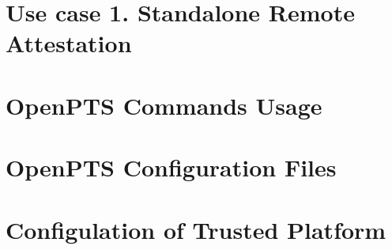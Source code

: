\documentclass[10pt,a4paper]{article}
\begin{document}
\clearpage
\section{Use case 1. Standalone Remote Attestation}


%




\clearpage
\section{OpenPTS Commands Usage} 

\clearpage
\section{OpenPTS Configuration Files} 

\clearpage
\section{Configulation of Trusted Platform}

\end{document}
